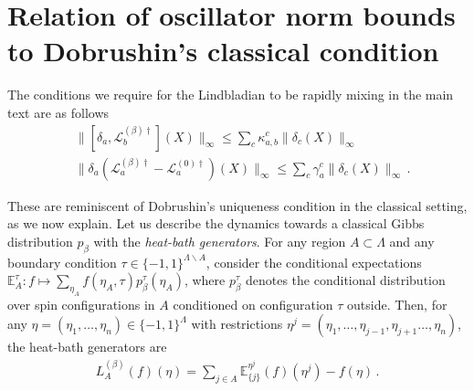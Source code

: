 \documentclass[aps,pra,amsmath,amssymb,twocolumn,10pt]{revtex4-2}
\theoremstyle{definition}
\begin{document}



\appendix

\pagestyle{fancy}
\fancyhf{} %
\fancyfoot[C]{\thepage} %
\renewcommand{\headrulewidth}{0pt} %
\renewcommand{\footrulewidth}{0pt}
\widetext

\section{Relation of oscillator norm bounds to Dobrushin's classical condition}

	\noindent The conditions we require for the Lindbladian to be rapidly mixing in the main text are as follows
	\begin{align}
		&\|[\delta_a, \mathcal{L}_b^{(\beta)\dagger}](X)\|_\infty\le \sum_c \kappa^c_{a,b} \|\delta_c(X)\|_\infty\label{eq:11}\\
		&\|\delta_a(\mathcal{L}_a^{(\beta)\dagger}-\mathcal{L}_a^{(0)\dagger})(X)\|_\infty\le \sum_c \gamma_a^c\|\delta_c(X)\|_\infty\,.\label{eq:22}
\end{align}

	These are reminiscent of Dobrushin's uniqueness condition in the classical setting, as we now explain. Let us describe the dynamics towards a classical Gibbs distribution $p_\beta$ with the \emph{heat-bath generators}. For any region $A\subset \Lambda$ and any boundary condition $\tau\in \{-1,1\}^{\Lambda\backslash A}$, consider the conditional expectations $\mathbb{E}_{A}^{\tau}:f\mapsto \sum_{\eta_A}f(\eta_A,\tau)p^{\tau}_\beta(\eta_A)$, where $p_\beta^{\tau}$ denotes the conditional distribution over spin configurations in $A$ conditioned on configuration $\tau$ outside. Then, for any $\eta=(\eta_1,\dots,\eta_n)\in\{-1,1\}^{\Lambda}$ with restrictions $\eta^j=(\eta_1,\dots,\eta_{j-1},\eta_{j+1}\dots ,\eta_n)$, the heat-bath generators are
	\begin{align*}
		L^{(\beta)}_A(f)(\eta)=\sum_{j\in A} \mathbb{E}_{\{j\}}^{\eta^j}(f)(\eta^j)-f(\eta)\,.
\end{align*}
\end{document}
